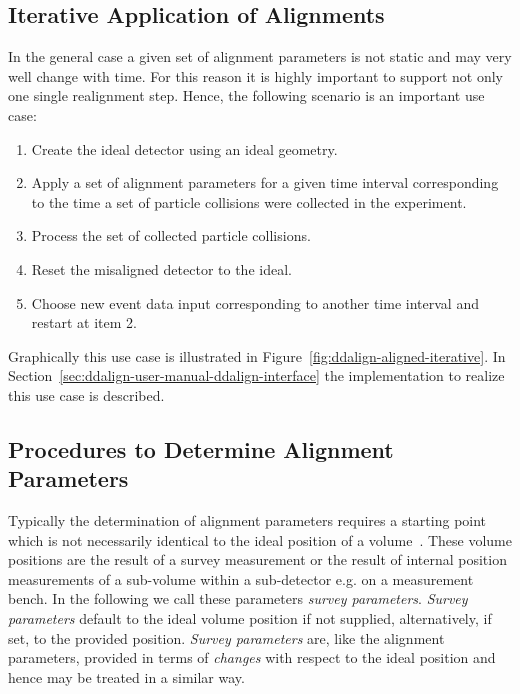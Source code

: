 \documentclass[10pt,a4paper]{article}
\begin{document}
\subsection{Iterative Application of Alignments}
\label{subsect:ddalign-intro-iterative-alignments}
\noindent
In the general case a given set of alignment parameters is not static and 
may very well change with time. For this reason it is highly important to 
support not only one single realignment step.
Hence, the following scenario is an important use case:
\begin{enumerate}\itemcompact
\item Create the ideal detector using an ideal geometry.
\item Apply a set of alignment parameters for a given time 
    interval corresponding to the 
    time a set of particle collisions were collected in the experiment.
\item Process the set of collected particle collisions.
\item Reset the misaligned detector to the ideal.
\item Choose new event data input corresponding to another time interval
    and restart at item 2.
\end{enumerate}
Graphically this use case is illustrated in 
Figure~\ref{fig:ddalign-aligned-iterative}. In 
Section~\ref{sec:ddalign-user-manual-ddalign-interface} the implementation 
to realize this use case is described.

\subsection{Procedures to Determine Alignment Parameters}
\label{subsect:ddalign-intro-determine-alignment-params}
\noindent
Typically the determination of alignment parameters requires a starting point
which is not necessarily identical to the ideal position of a 
volume~\cite{bib:chris-parkes-priv-comm}. These volume positions are the result
of a survey measurement or the result of internal position measurements 
of a sub-volume within a sub-detector e.g. on a measurement bench.
In the following we call these parameters {\it{survey parameters}}. 
{\it{Survey parameters}} default to the ideal volume position if not supplied,
alternatively, if set, to the provided position. {\it{Survey parameters}}
are, like the alignment parameters, provided in terms of {\it{changes}} with 
respect to the ideal position and hence may be treated in a similar way.
\end{document}
